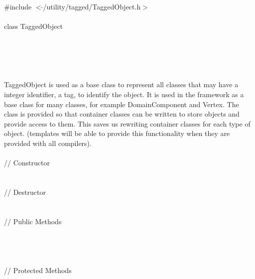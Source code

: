 
   \\
\indent \#include $<\tilde{ }$/utility/tagged/TaggedObject.h$>$ \\

  \\
\indent class TaggedObject  \\

 \\
 \\
\indent{} \\
\indent{} \\

  \\
\indent TaggedObject is used as a base class to represent all classes
that may have a integer identifier, a tag, to identify the object. It
is used in the framework as a base class for many classes, for example
DomainComponent and Vertex. The class is provided so that container
classes can be written to store objects and provide access to
them. This saves us rewriting container classes for each type of 
object. (templates will be able to provide this functionality when
they are provided with all compilers). \\ 

  \\
\indent // Constructor  \\
  \\ \\
\indent // Destructor  \\
  \\ \\
\indent // Public Methods  \\
 \\ 
 \\
 \\  \\ 
\indent // Protected Methods  \\
 \\

